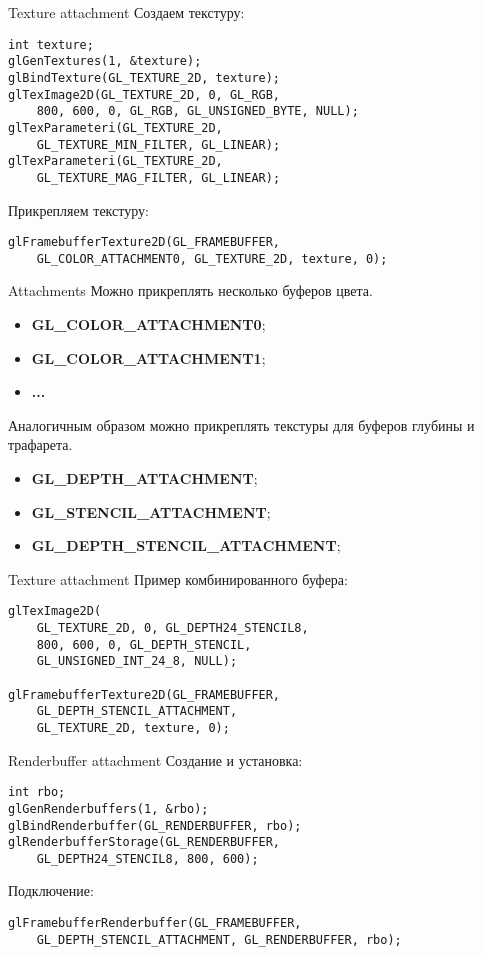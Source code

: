 \documentclass[aspectration=1610,t]{beamer}
\begin{document}
\begin{frame}[fragile]{Texture attachment}
    Создаем текстуру:
    {\small \begin{lstlisting}
int texture;
glGenTextures(1, &texture);
glBindTexture(GL_TEXTURE_2D, texture);
glTexImage2D(GL_TEXTURE_2D, 0, GL_RGB, 
    800, 600, 0, GL_RGB, GL_UNSIGNED_BYTE, NULL);
glTexParameteri(GL_TEXTURE_2D, 
    GL_TEXTURE_MIN_FILTER, GL_LINEAR);
glTexParameteri(GL_TEXTURE_2D,
    GL_TEXTURE_MAG_FILTER, GL_LINEAR);  
    \end{lstlisting}}
    Прикрепляем текстуру:
    {\small \begin{lstlisting}
glFramebufferTexture2D(GL_FRAMEBUFFER, 
    GL_COLOR_ATTACHMENT0, GL_TEXTURE_2D, texture, 0);  
    \end{lstlisting}}
\end{frame}

\begin{frame}[fragile]{Attachments}
    Можно прикреплять несколько буферов цвета.
    \begin{itemize}
        \item {\bf GL\_COLOR\_ATTACHMENT0};
        \item {\bf GL\_COLOR\_ATTACHMENT1};
        \item {\bf ...}
    \end{itemize}
    Аналогичным образом можно прикреплять текстуры для буферов глубины и трафарета.
    \begin{itemize}
        \item {\bf GL\_DEPTH\_ATTACHMENT};
        \item {\bf GL\_STENCIL\_ATTACHMENT};
        \item {\bf GL\_DEPTH\_STENCIL\_ATTACHMENT};
    \end{itemize}
\end{frame}

\begin{frame}[fragile]{Texture attachment}
    Пример комбинированного буфера:
    {\small \begin{lstlisting}
glTexImage2D(
    GL_TEXTURE_2D, 0, GL_DEPTH24_STENCIL8, 
    800, 600, 0, GL_DEPTH_STENCIL, 
    GL_UNSIGNED_INT_24_8, NULL);
    
glFramebufferTexture2D(GL_FRAMEBUFFER, 
    GL_DEPTH_STENCIL_ATTACHMENT, 
    GL_TEXTURE_2D, texture, 0);          
    \end{lstlisting}}
\end{frame}

\begin{frame}[fragile]{Renderbuffer attachment}
    Создание и установка:
    {\small \begin{lstlisting}
int rbo;
glGenRenderbuffers(1, &rbo);
glBindRenderbuffer(GL_RENDERBUFFER, rbo); 
glRenderbufferStorage(GL_RENDERBUFFER, 
    GL_DEPTH24_STENCIL8, 800, 600);        
    \end{lstlisting}}
    Подключение:
    {\small \begin{lstlisting}
glFramebufferRenderbuffer(GL_FRAMEBUFFER, 
    GL_DEPTH_STENCIL_ATTACHMENT, GL_RENDERBUFFER, rbo); 
    \end{lstlisting}}
\end{frame}
\end{document}
